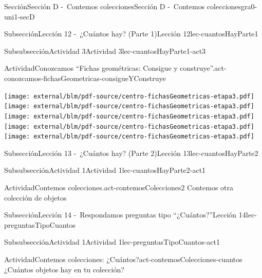\begin{sectionptx}{Sección}{Sección D -~Contemos colecciones}{}{Sección D -~Contemos colecciones}{}{}{gra0-uni1-secD}
\begin{subsectionptx}{Subsección}{Lección 12 -~¿Cuántos hay? (Parte 1)}{}{Lección 12}{}{}{lec-cuantosHayParte1}
\begin{subsubsectionptx}{Subsubsección}{Actividad 3}{}{Actividad 3}{}{}{lec-cuantosHayParte1-act3}
\begin{activity}{Actividad}{Conozcamos “Fichas geométricas: Consigue y construye”.}{act-conozcamos-fichasGeometricas-consigueYConstruye}
\begin{cutoutpage}
\clearpage
\texttt{[image: external/blm/pdf-source/centro-fichasGeometricas-etapa3.pdf]}
\clearpage
\texttt{[image: external/blm/pdf-source/centro-fichasGeometricas-etapa3.pdf]}
\clearpage
\texttt{[image: external/blm/pdf-source/centro-fichasGeometricas-etapa3.pdf]}
\clearpage
\texttt{[image: external/blm/pdf-source/centro-fichasGeometricas-etapa3.pdf]}
\clearpage
\texttt{[image: external/blm/pdf-source/centro-fichasGeometricas-etapa3.pdf]}
\clearpage
\end{cutoutpage}
\end{activity}%
\end{subsubsectionptx}
\end{subsectionptx}
%
%
\typeout{************************************************}
\typeout{************************************************}
%
\begin{subsectionptx}{Subsección}{Lección 13 -~¿Cuántos hay? (Parte 2)}{}{Lección 13}{}{}{lec-cuantosHayParte2}
%
%
\typeout{************************************************}
\typeout{************************************************}
%
\begin{subsubsectionptx}{Subsubsección}{Actividad 1}{}{Actividad 1}{}{}{lec-cuantosHayParte2-act1}
\begin{activity}{Actividad}{Contemos colecciones.}{act-contemosColecciones2}%
Contemos otra colección de objetos%
\end{activity}%
\end{subsubsectionptx}
\end{subsectionptx}
%
%
\typeout{************************************************}
\typeout{************************************************}
%
\begin{subsectionptx}{Subsección}{Lección 14 -~Respondamos preguntas tipo “¿Cuántos?”}{}{Lección 14}{}{}{lec-preguntasTipoCuantos}
%
%
\typeout{************************************************}
\typeout{************************************************}
%
\begin{subsubsectionptx}{Subsubsección}{Actividad 1}{}{Actividad 1}{}{}{lec-preguntasTipoCuantos-act1}
\begin{activity}{Actividad}{Contemos colecciones: ¿Cuántos?}{act-contemosColecciones-cuantos}%
¿Cuántos objetos hay en tu colección?%
\end{activity}%
\end{subsubsectionptx}

\end{subsectionptx}
\end{sectionptx}
